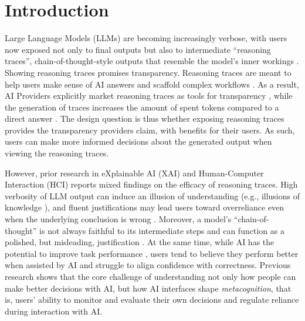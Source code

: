 \documentclass[manuscript,review,anonymous]{acmart}
\begin{document}
\section{Introduction}

Large Language Models (LLMs) are becoming increasingly verbose, with users now exposed not only to final outputs but also to intermediate ``reasoning traces'', chain-of-thought-style outputs that resemble the model's inner workings \cite{barez2025chain}. Showing reasoning traces promises transparency. Reasoning traces are meant to help users make sense of AI answers and scaffold complex workflows \cite{6645235,anthropic2025extended,openai2024learning,openai2025monitorability}. As a result, AI Providers explicitly market reasoning traces as tools for transparency \cite{lindsey2025biology}, while the generation of traces increases the amount of spent tokens compared to a direct answer \cite{sui2025stop, anthropic2025extended}. The design question is thus whether exposing reasoning traces provides the transparency providers claim, with benefits for their users. As such, users can make more informed decisions about the generated output when viewing the reasoning traces.

However, prior research in eXplainable AI (XAI) and Human-Computer Interaction (HCI) reports mixed findings on the efficacy of reasoning traces. High verbosity of LLM output can induce an illusion of understanding (e.g., illusions of knowledge \cite{fisher2021harder}), and fluent justifications may lead users toward overreliance even when the underlying conclusion is wrong \cite{10.1145/3397481.3450639, 10.1145/3449287}. Moreover, a model's ``chain-of-thought'' is not always faithful to its intermediate steps and can function as a polished, but misleading, justification \cite{10.5555/3666122.3669397,lindsey2025biology, barez2025chain}. At the same time, while AI has the potential to improve task performance \cite{10.1145/3411764.3445717, steyvers_bayesian_2022,zulfikar_memoro_2024}, users tend to believe they perform better when assisted by AI \cite{FERNANDES2026108779, kloft2023ai, villa2023placebo, kosch2023placebo} and struggle to align confidence with correctness. Previous research shows that the core challenge of understanding not only how people can make better decisions with AI, but how AI interfaces shape \textit{metacognition}, that is, users' ability to monitor and evaluate their own decisions and regulate reliance during interaction with AI.%
\end{document}
